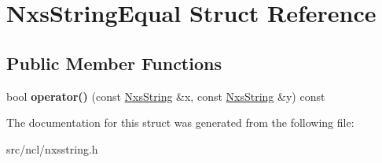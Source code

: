 \hypertarget{structNxsStringEqual}{
\section{NxsStringEqual Struct Reference}
\label{structNxsStringEqual}
}
\subsection*{Public Member Functions}
\begin{DoxyCompactItemize}
\item 
\hypertarget{structNxsStringEqual_aa394cf5616bb90e30a5287eb3422bac0}{
bool {\bfseries operator()} (const \hyperlink{classNxsString}{NxsString} \&x, const \hyperlink{classNxsString}{NxsString} \&y) const }
\label{structNxsStringEqual_aa394cf5616bb90e30a5287eb3422bac0}

\end{DoxyCompactItemize}


The documentation for this struct was generated from the following file:\begin{DoxyCompactItemize}
\item 
src/ncl/nxsstring.h\end{DoxyCompactItemize}
